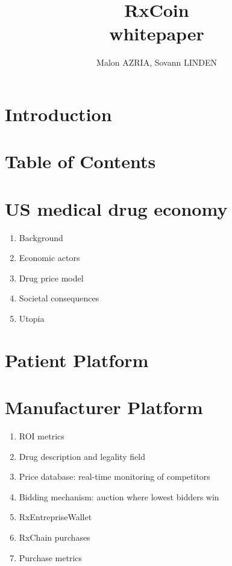 \documentclass[a4paper,11pt]{article}
\title{RxCoin\\\Large{whitepaper}\\}
\author{Malon AZRIA, Sovann LINDEN}
\begin{document}
   \maketitle

   
\section{Introduction}
   

 

\section{Table of Contents}
   

\section{US medical drug economy }   
   \begin{enumerate}
     \item Background
     \item Economic actors
     \item Drug price model
     \item Societal consequences
     \item Utopia
   \end{enumerate}
   
\section{Patient Platform}
   

\section{Manufacturer Platform}
   \begin{enumerate}
     \item ROI metrics
     \item Drug description and legality field
     \item Price database: real-time monitoring of competitors
     \item Bidding mechanism: auction where lowest bidders win
     \item RxEntrepriseWallet
     \item RxChain purchases
     \item Purchase metrics
   \end{enumerate}
   
\end{document}
